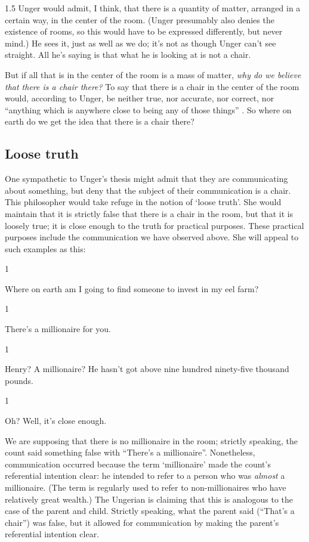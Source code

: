 \documentclass[11pt]{standalone} \newif\ifstandlone \standalonetrue
\newcommand{\stage}[3]%
{%
	\begin{spacing}{1}%
	\vspace{0pt}
		\begin{description}[style=nextline, parsep=0pt,
                    leftmargin=15mm, itemindent=-10mm, font=\mdseries]
			\item[\textsc{#1} \emph{#2}] #3
		\end{description}%
	\end{spacing}%
}
\begin{document}
\begin{spacing}{1.5}
Unger would admit, I think, that there is a quantity of matter,
arranged in a certain way, in the center of the room.  (Unger
presumably also denies the existence of rooms, so this would have to
be expressed differently, but never mind.)  He sees it, just as well
as we do; it's not as though Unger can't see straight.  All he's
saying is that what he is looking at is not a chair.

But if all that is in the center of the room is a mass of matter, {\em
  why do we believe that there is a chair there?}  To say that there
is a chair in the center of the room would, according to Unger, be
neither true, nor accurate, nor correct, nor ``anything which is
anywhere close to being any of those things'' \citep[148]{unger1979}.
So where on earth do we get the idea that there is a chair there?

\subsection{Loose truth}
\label{loose-u}
One sympathetic to Unger's thesis might admit that they are
communicating about something, but deny that the subject of their
communication is a chair.  This philosopher would take refuge in the
notion of `loose truth'.  She would maintain that it is strictly false
that there is a chair in the room, but that it is loosely true; it is
close enough to the truth for practical purposes.  These practical
purposes include the communication we have observed above.  She will
appeal to such examples as this:

\stage{Countess}{}{Where on earth am I going to find someone to invest
  in my eel farm?}

\stage{Count}{(pointing)}{There's a millionaire for you.}

\stage{Countess}{(incredulous)}{Henry? A millionaire? He hasn't got
  above nine hundred ninety-five thousand pounds.}

\stage{Count}{}{Oh? Well, it's close enough.}

We are supposing that there is no millionaire in the room; strictly
speaking, the count said something false with ``There's a
millionaire''.  Nonetheless, communication occurred because the term
`millionaire' made the count's referential intention clear: he
intended to refer to a person who was {\em almost} a millionaire.
(The term is regularly used to refer to non-millionaires who have
relatively great wealth.)  The Ungerian is claiming that this is
analogous to the case of the parent and child.  Strictly speaking,
what the parent said (``That's a chair'') was false, but it allowed
for communication by making the parent's referential intention clear.


\end{spacing}
\end{document}
